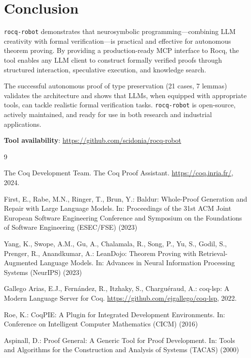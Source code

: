 \documentclass[11pt,a4paper]{article}
\newcommand{\tool}{\texttt{rocq-robot}\xspace}
\begin{document}
\section{Conclusion}

\tool demonstrates that neurosymbolic programming—combining LLM creativity with formal verification—is practical and effective for autonomous theorem proving. By providing a production-ready MCP interface to Rocq, the tool enables any LLM client to construct formally verified proofs through structured interaction, speculative execution, and knowledge search.

The successful autonomous proof of type preservation (21 cases, 7 lemmas) validates the architecture and shows that LLMs, when equipped with appropriate tools, can tackle realistic formal verification tasks. \tool is open-source, actively maintained, and ready for use in both research and industrial applications.

\textbf{Tool availability}: \url{https://github.com/scidonia/rocq-robot}


\begin{thebibliography}{9}

The Coq Development Team.
The Coq Proof Assistant.
\url{https://coq.inria.fr/}, 2024.

First, E., Rabe, M.N., Ringer, T., Brun, Y.:
Baldur: Whole-Proof Generation and Repair with Large Language Models.
In: Proceedings of the 31st ACM Joint European Software Engineering Conference and Symposium on the Foundations of Software Engineering (ESEC/FSE) (2023)

Yang, K., Swope, A.M., Gu, A., Chalamala, R., Song, P., Yu, S., Godil, S., Prenger, R., Anandkumar, A.:
LeanDojo: Theorem Proving with Retrieval-Augmented Language Models.
In: Advances in Neural Information Processing Systems (NeurIPS) (2023)

Gallego Arias, E.J., Fernández, R., Itzhaky, S., Charguéraud, A.:
coq-lsp: A Modern Language Server for Coq.
\url{https://github.com/ejgallego/coq-lsp}, 2022.

Roe, K.:
CoqPIE: A Plugin for Integrated Development Environments.
In: Conference on Intelligent Computer Mathematics (CICM) (2016)

Aspinall, D.:
Proof General: A Generic Tool for Proof Development.
In: Tools and Algorithms for the Construction and Analysis of Systems (TACAS) (2000)

\end{thebibliography}
\end{document}
